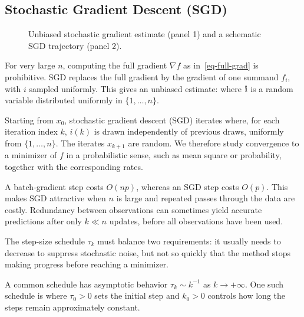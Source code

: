 \subsection{Stochastic Gradient Descent (SGD)}

\begin{figure}[tbp]
\centering
{}\hfill
{}
\caption{Unbiased stochastic gradient estimate (panel 1) and a schematic SGD trajectory (panel 2).}
\label{fig-review-advanced-unbiased-gradient}
\label{fig-review-advanced-sgd-trajectory}
\end{figure}
For very large $n$, computing the full gradient $\nabla f$ as in~\eqref{eq-full-grad} is prohibitive.  
%
SGD replaces the full gradient by the gradient of one summand $f_{i}$, with $i$ sampled uniformly. This gives an unbiased estimate:
where $\mathbf{i}$ is a random variable distributed uniformly in $\{1,\ldots,n\}$.


Starting from $x_0$, stochastic gradient descent (SGD) iterates
where, for each iteration index $k$, $i(k)$
is drawn independently of previous draws, uniformly from $\{1,\ldots,n\}$.
%
The iterates $x_{k+1}$ are random. We therefore study convergence to a minimizer of $f$ in a probabilistic sense, such as mean square or probability, together with the corresponding rates.

A batch-gradient step costs $O(np)$,
whereas an SGD step costs $O(p)$. This makes SGD attractive
when $n$ is large and repeated passes through the data are costly.
Redundancy between observations can sometimes yield
accurate predictions after only $k \ll n$ updates, before all
observations have been used.

The step-size schedule $\tau_k$ must balance two requirements: it
usually needs to decrease to suppress stochastic noise,
but not so quickly that the method stops making progress
before reaching a minimizer.


A common schedule has asymptotic behavior $\tau_k \sim k^{-1}$
as $k\rightarrow +\infty$. One such schedule is
where $\tau_0>0$ sets the initial step and $k_0>0$ controls how long the steps remain approximately constant.


